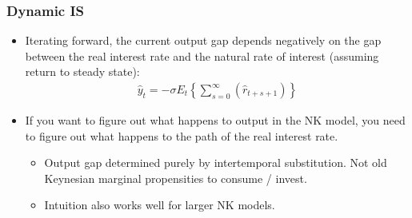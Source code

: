 \documentclass[english,xcolor=svgnames]{beamer}
\begin{document}
%
%
\begin{frame}
\frametitle{Dynamic IS
}
\begin{itemize}
	\item Iterating forward, the current output gap depends negatively on the gap between the real interest rate and the natural rate of interest (assuming return to steady state):
	\begin{align*}
		\hat{y}_t=-\sigma E_t\left\{\sum_{s=0}^{\infty}\left(\hat{r}_{t+s+1}\right)\right\}
	\end{align*}
	\item If you want to figure out what happens to output in the NK model, you need to figure out what happens to the path of the real interest rate.
	\begin{itemize}
		\item Output gap determined purely by intertemporal substitution. Not old Keynesian marginal propensities to consume / invest.
		\item Intuition also works well for larger NK models.
	\end{itemize}
\end{itemize}
\end{frame}
\end{document}
